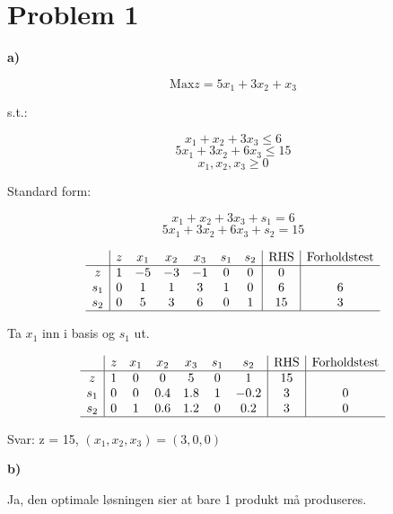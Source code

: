 \documentclass{article}
\begin{document}


\section*{\textbf{Problem 1}}
\vspace*{12pt}\small\textbf{a)}


\[
    \text{Max} z = 5x_1 + 3x_2 + x_3
\]

s.t.:

\[
    x_1 + x_2 + 3x_3 \leq 6
\]
\[
    5x_1 + 3x_2 + 6x_3 \leq 15
\]
\[
    x_1, x_2, x_3 \geq 0
\]

Standard form:

\[
    x_1 + x_2 + 3x_3 + s_1 = 6
\]
\[
    5x_1 + 3x_2 + 6x_3 + s_2 = 15
\]


\[
    \begin{array}{c|cccccc|c|c}
            & z & x_1 & x_2 & x_3 & s_1 & s_2 & \text{RHS} & \text{Forholdstest} \\
        \hline
        z   & 1 & -5  & -3  & -1  & 0   & 0   & 0          &                     \\
        s_1 & 0 & 1   & 1   & 3   & 1   & 0   & 6          & 6                   \\
        s_2 & 0 & 5   & 3   & 6   & 0   & 1   & 15         & 3                   \\
        \hline
    \end{array}
\]

Ta $x_1$ inn i basis og $s_1$ ut.

\[
    \begin{array}{c|cccccc|c|c}
            & z & x_1 & x_2 & x_3 & s_1 & s_2  & \text{RHS} & \text{Forholdstest} \\
        \hline
        z   & 1 & 0   & 0   & 5   & 0   & 1    & 15         &                     \\
        s_1 & 0 & 0   & 0.4 & 1.8 & 1   & -0.2 & 3          & 0                   \\
        s_2 & 0 & 1   & 0.6 & 1.2 & 0   & 0.2  & 3          & 0                   \\
        \hline
    \end{array}
\]

Svar: z = 15,
$(x_1, x_2, x_3) = (3, 0, 0)$

\vspace*{12pt}\small\textbf{b)}

Ja, den optimale løsningen sier at bare 1 produkt må produseres.
\end{document}
